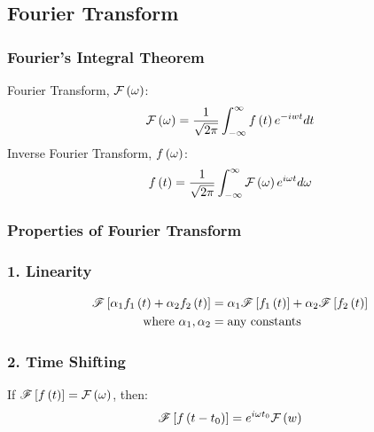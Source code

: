 \subsection{Fourier Transform}
\subsubsection{Fourier's Integral Theorem}
\vspace{0.5ex}
Fourier Transform, $\mathcal{F}\left(\omega\right)$:
\begin{equation}
    \mathcal{F}\left(\omega\right)=\frac{1}{\sqrt{2\pi}}\int_{-\infty}^{\infty}f\left(t\right)e^{-iwt}dt
\end{equation}
Inverse Fourier Transform, $f\left(\omega\right)$:
\begin{equation}
    f\left(t\right)=\frac{1}{\sqrt{2\pi}}\int_{-\infty}^{\infty}\mathcal{F}\left(\omega\right)e^{i\omega t}d\omega
\end{equation}
\subsubsection{Properties of Fourier Transform}
\subsubsection*{1. Linearity}
\begin{align}
    \mathscr{F}\left[\alpha_1f_1\left(t\right)+\alpha_2f_2\left(t\right)\right]&=\alpha_1\mathscr{F}\left[f_1\left(t\right)\right]+\alpha_2\mathscr{F}\left[f_2\left(t\right)\right]\\
    \text{where }\alpha_1,\alpha_2&=\text{any constants}\nonumber
\end{align}
\subsubsection*{2. Time Shifting}
If $\mathscr{F}\left[f\left(t\right)\right]=\mathcal{F}\left(\omega\right)$, then:
\begin{equation}
    \mathscr{F}\left[f\left(t-t_0\right)\right]=e^{i\omega t_0}\mathcal{F}\left(w\right)
\end{equation}
